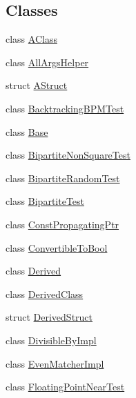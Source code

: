 \subsection*{Classes}
\begin{DoxyCompactItemize}
\item 
class \mbox{\hyperlink{classtesting_1_1gmock__matchers__test_1_1_a_class}{A\+Class}}
\item 
class \mbox{\hyperlink{classtesting_1_1gmock__matchers__test_1_1_all_args_helper}{All\+Args\+Helper}}
\item 
struct \mbox{\hyperlink{structtesting_1_1gmock__matchers__test_1_1_a_struct}{A\+Struct}}
\item 
class \mbox{\hyperlink{classtesting_1_1gmock__matchers__test_1_1_backtracking_b_p_m_test}{Backtracking\+B\+P\+M\+Test}}
\item 
class \mbox{\hyperlink{classtesting_1_1gmock__matchers__test_1_1_base}{Base}}
\item 
class \mbox{\hyperlink{classtesting_1_1gmock__matchers__test_1_1_bipartite_non_square_test}{Bipartite\+Non\+Square\+Test}}
\item 
class \mbox{\hyperlink{classtesting_1_1gmock__matchers__test_1_1_bipartite_random_test}{Bipartite\+Random\+Test}}
\item 
class \mbox{\hyperlink{classtesting_1_1gmock__matchers__test_1_1_bipartite_test}{Bipartite\+Test}}
\item 
class \mbox{\hyperlink{classtesting_1_1gmock__matchers__test_1_1_const_propagating_ptr}{Const\+Propagating\+Ptr}}
\item 
class \mbox{\hyperlink{classtesting_1_1gmock__matchers__test_1_1_convertible_to_bool}{Convertible\+To\+Bool}}
\item 
class \mbox{\hyperlink{classtesting_1_1gmock__matchers__test_1_1_derived}{Derived}}
\item 
class \mbox{\hyperlink{classtesting_1_1gmock__matchers__test_1_1_derived_class}{Derived\+Class}}
\item 
struct \mbox{\hyperlink{structtesting_1_1gmock__matchers__test_1_1_derived_struct}{Derived\+Struct}}
\item 
class \mbox{\hyperlink{classtesting_1_1gmock__matchers__test_1_1_divisible_by_impl}{Divisible\+By\+Impl}}
\item 
class \mbox{\hyperlink{classtesting_1_1gmock__matchers__test_1_1_even_matcher_impl}{Even\+Matcher\+Impl}}
\item 
class \mbox{\hyperlink{classtesting_1_1gmock__matchers__test_1_1_floating_point_near_test}{Floating\+Point\+Near\+Test}}

\end{DoxyCompactItemize}
